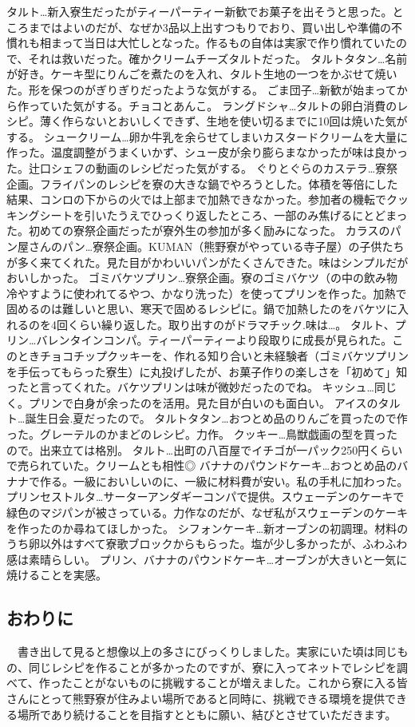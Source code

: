 タルト…新入寮生だったがティーパーティー新歓でお菓子を出そうと思った。ところまではよいのだが、なぜか3品以上出すつもりでおり、買い出しや準備の不慣れも相まって当日は大忙しとなった。作るもの自体は実家で作り慣れていたので、それは救いだった。確かクリームチーズタルトだった。
タルトタタン…名前が好き。ケーキ型にりんごを煮たのを入れ、タルト生地の一つをかぶせて焼いた。形を保つのがぎりぎりだったような気がする。
ごま団子…新歓が始まってから作っていた気がする。チョコとあんこ。
ラングドシャ…タルトの卵白消費のレシピ。薄く作らないとおいしくできず、生地を使い切るまでに10回は焼いた気がする。
シュークリーム…卵か牛乳を余らせてしまいカスタードクリームを大量に作った。温度調整がうまくいかず、シュー皮が余り膨らまなかったが味は良かった。辻口シェフの動画のレシピだった気がする。
ぐりとぐらのカステラ…寮祭企画。フライパンのレシピを寮の大きな鍋でやろうとした。体積を等倍にした結果、コンロの下からの火では上部まで加熱できなかった。参加者の機転でクッキングシートを引いたうえでひっくり返したところ、一部のみ焦げるにとどまった。初めての寮祭企画だったが寮外生の参加が多く励みになった。
カラスのパン屋さんのパン…寮祭企画。KUMAN（熊野寮がやっている寺子屋）の子供たちが多く来てくれた。見た目がかわいいパンがたくさんできた。味はシンプルだがおいしかった。
ゴミバケツプリン…寮祭企画。寮のゴミバケツ（の中の飲み物冷やすように使われてるやつ、かなり洗った）を使ってプリンを作った。加熱で固めるのは難しいと思い、寒天で固めるレシピに。鍋で加熱したのをバケツに入れるのを4回くらい繰り返した。取り出すのがドラマチック.味は…。
タルト、プリン…バレンタインコンパ。ティーパーティーより段取りに成長が見られた。このときチョコチップクッキーを、作れる知り合いと未経験者（ゴミバケツプリンを手伝ってもらった寮生）に丸投げしたが、お菓子作りの楽しさを「初めて」知ったと言ってくれた。バケツプリンは味が微妙だったのでね。
キッシュ…同じく。プリンで白身が余ったのを活用。見た目が白いのも面白い。
アイスのタルト…誕生日会.夏だったので。
タルトタタン…おつとめ品のりんごを買ったので作った。グレーテルのかまどのレシピ。力作。
クッキー…鳥獣戯画の型を買ったので。出来立ては格別。
タルト…出町の八百屋でイチゴが一パック250円くらいで売られていた。クリームとも相性◎
バナナのパウンドケーキ…おつとめ品のバナナで作る。一級においしいのに、一級に材料費が安い。私の手札に加わった。
プリンセストルタ…サーターアンダギーコンパで提供。スウェーデンのケーキで緑色のマジパンが被さっている。力作なのだが、なぜ私がスウェーデンのケーキを作ったのか尋ねてほしかった。
シフォンケーキ…新オーブンの初調理。材料のうち卵以外はすべて寮歌ブロックからもらった。塩が少し多かったが、ふわふわ感は素晴らしい。
プリン、バナナのパウンドケーキ…オーブンが大きいと一気に焼けることを実感。

\subsection{おわりに}
　書き出して見ると想像以上の多さにびっくりしました。実家にいた頃は同じもの、同じレシピを作ることが多かったのですが、寮に入ってネットでレシピを調べて、作ったことがないものに挑戦することが増えました。これから寮に入る皆さんにとって熊野寮が住みよい場所であると同時に、挑戦できる環境を提供できる場所であり続けることを目指すとともに願い、結びとさせていただきます。